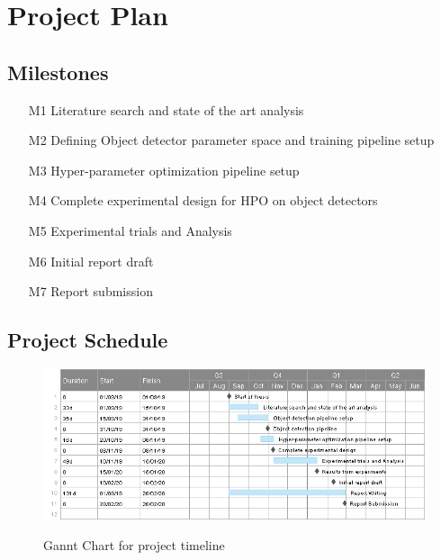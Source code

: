 \documentclass[thesis]{mas_proposal}
\begin{document}
\section{Project Plan}


\subsection{Milestones}
\begin{enumerate}
    \item[M1] Literature search and state of the art analysis
    \item[M2] Defining Object detector parameter space and training pipeline setup
    \item[M3] Hyper-parameter optimization pipeline setup 
    \item[M4] Complete experimental design for HPO on object detectors
    \item[M5] Experimental trials and Analysis
    \item[M6] Initial report draft 
    \item[M7] Report submission
\end{enumerate}
\newpage
\subsection{Project Schedule}
\begin{figure}[!htb]
    \caption{Gannt Chart for project timeline}
    \includegraphics[width=\textwidth]{images/ThesisProposal.png}
    \label{Thesis_Timeline}
\end{figure}
\end{document}
